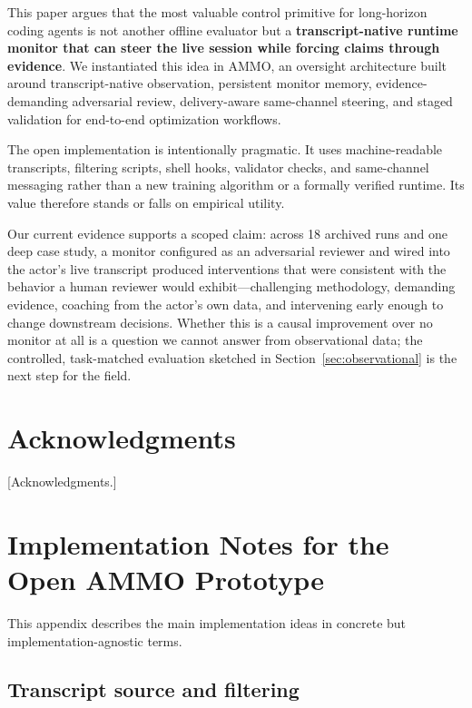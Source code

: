 \documentclass[11pt]{article}
\begin{document}
This paper argues that the most valuable control primitive for long-horizon coding agents is not another offline evaluator but a \textbf{transcript-native runtime monitor that can steer the live session while forcing claims through evidence}. We instantiated this idea in AMMO, an oversight architecture built around transcript-native observation, persistent monitor memory, evidence-demanding adversarial review, delivery-aware same-channel steering, and staged validation for end-to-end optimization workflows.

The open implementation is intentionally pragmatic. It uses machine-readable transcripts, filtering scripts, shell hooks, validator checks, and same-channel messaging rather than a new training algorithm or a formally verified runtime. Its value therefore stands or falls on empirical utility.

Our current evidence supports a scoped claim: across 18 archived runs and one deep case study, a monitor configured as an adversarial reviewer and wired into the actor's live transcript produced interventions that were consistent with the behavior a human reviewer would exhibit---challenging methodology, demanding evidence, coaching from the actor's own data, and intervening early enough to change downstream decisions. Whether this is a causal improvement over no monitor at all is a question we cannot answer from observational data; the controlled, task-matched evaluation sketched in Section~\ref{sec:observational} is the next step for the field.

\section*{Acknowledgments}

[Acknowledgments.]

\appendix

\section{Implementation Notes for the Open AMMO Prototype}

This appendix describes the main implementation ideas in concrete but implementation-agnostic terms.

\subsection{Transcript source and filtering}
\end{document}
